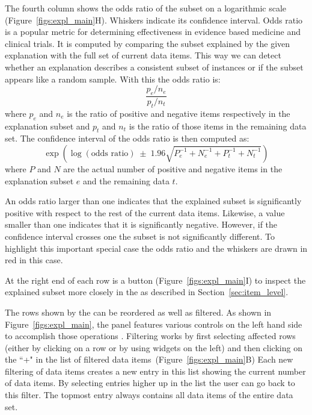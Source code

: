 The fourth column shows the odds ratio of the subset on a logarithmic scale (Figure~\ref{figs:expl_main}H).
Whiskers indicate its confidence interval.
Odds ratio is a popular metric for determining effectiveness in evidence based medicine and clinical trials.
It is computed by comparing the subset explained by the given explanation with the full set of current data items.
This way we can detect whether an explanation describes a consistent subset of instances or if the subset appears like a random sample.
With this the odds ratio is:
\vspace*{-0.5em}
\[
\frac{p_e / n_e}{p_t / n_t}
\]
\vspace*{-0.5em}
where $p_e$ and $n_e$ is the ratio of positive and negative items respectively in the explanation subset and $p_t$ and $n_t$ is the ratio of those items in the remaining data set.
The confidence interval of the odds ratio is then computed as:
\vspace*{-0.5em}
\[
\exp{\left(\log{(\text{odds ratio})} \; \pm \; 1.96 \sqrt{P_e^{-1} + N_e^{-1} + P_t^{-1} + N_t^{-1}}\right)}
\]
\vspace*{-0.5em}
where $P$ and $N$ are the actual number of positive and negative items in the explanation subset $e$ and the remaining data $t$.

An odds ratio larger than one indicates that the explained subset is significantly positive with respect to the rest of the current data items.
Likewise, a value smaller than one indicates that it is significantly negative.
However, if the confidence interval crosses one the subset is not significantly different.
To highlight this important special case the odds ratio and the whiskers are drawn in red in this case.

At the right end of each row is a button (Figure~\ref{figs:expl_main}I) to inspect the explained subset more closely in the \tabC as described in Section~\ref{sec:item_level}.

% 



The rows shown by the \tabB can be reordered as well as filtered.
As shown in Figure~\ref{figs:expl_main}, the panel features various controls on the left hand side to accomplish those operations .
Filtering works by first selecting affected rows (either by clicking on a row or by using widgets on the left) and then clicking on the ``+" in the list of filtered data items~(Figure~\ref{figs:expl_main}B)
Each new filtering of data items creates a new entry in this list showing the current number of data items.
By selecting entries higher up in the list the user can go back to this filter.
The topmost entry always contains all data items of the entire data set.

